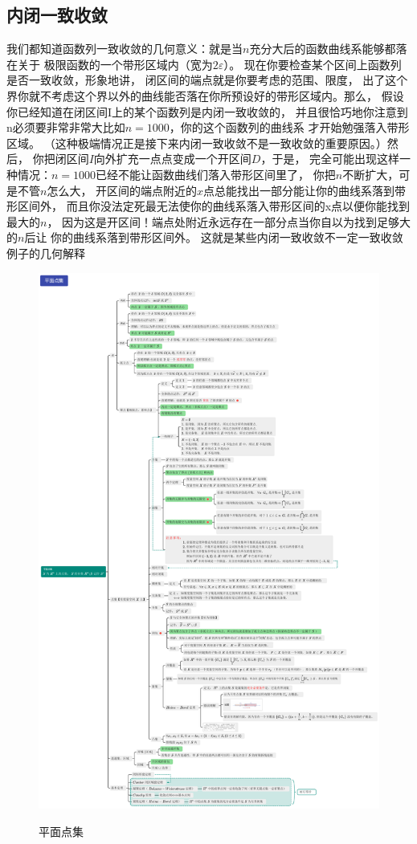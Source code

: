 \subsection{内闭一致收敛}
我们都知道函数列一致收敛的几何意义：就是当$n$充分大后的函数曲线系能够都落在关于
极限函数的一个带形区域内（宽为$2\varepsilon$）。
现在你要检查某个区间上函数列是否一致收敛，形象地讲，
闭区间的端点就是你要考虑的范围、限度，
出了这个界你就不考虑这个界以外的曲线能否落在你所预设好的带形区域内。那么，
假设你已经知道在闭区间I上的某个函数列是内闭一致收敛的，
并且很恰巧地你注意到n必须要非常非常大比如$n=1000$，你的这个函数列的曲线系
才开始勉强落入带形区域。
（这种极端情况正是接下来内闭一致收敛不是一致收敛的重要原因。）然后，
你把闭区间$I$向外扩充一点点变成一个开区间$D$，于是，
完全可能出现这样一种情况：$n=1000$已经不能让函数曲线们落入带形区间里了，
你把$n$不断扩大，可是不管$n$怎么大，
开区间的端点附近的$x$点总能找出一部分能让你的曲线系落到带形区间外，
而且你没法定死最无法使你的曲线系落入带形区间的x点以便你能找到最大的$n$，
因为这是开区间！端点处附近永远存在一部分点当你自以为找到足够大的$n$后让
你的曲线系落到带形区间外。
这就是某些内闭一致收敛不一定一致收敛例子的几何解释


\begin{figure}[!htb]
    \includegraphics[scale=0.3]{Chapter/TikZ/平面点集.pdf}
    \label{平面点集}
    \caption{平面点集}
\end{figure}
